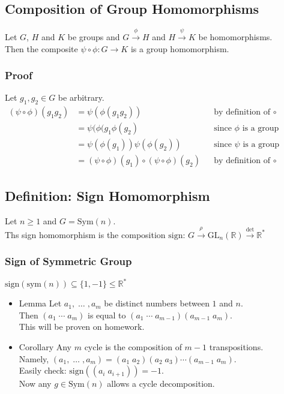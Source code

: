 \documentclass[11pt]{article}
\newcommand{\0}{\emptyset}
\newcommand{\R}{\mathbb{R}}
\begin{document}
\subsection*{Composition of Group Homomorphisms}
\label{sec:org04c6ffb}
Let \(G\), \(H\) and \(K\) be groups and \(G\overset{\phi}{\to}H\) and \(H\overset{\psi}{\to}K\) be homomorphisms.\\[0pt]
Then the composite \(\psi\circ\phi:G\to K\) is a group homomorphism.\\[0pt]
\subsubsection*{Proof}
\label{sec:orgb0ebbba}
Let \(g_{1},g_{2}\in G\) be arbitrary.\\[0pt]
\begin{align*}
  (\psi\circ\phi)(g_{1}g_{2})
  &=\psi(\phi(g_{1}g_{2})) && \text{by definition of }\circ
  \\&=\psi(\phi(g_{1}\phi(g_{2}) && \text{since $\phi$ is a group homomorphism}
  \\&=\psi(\phi(g_{1}))\psi(\phi(g_{2})) && \text{since $\psi$ is a group homomorphism}
  \\&=(\psi\circ\phi)(g_{1})\circ(\psi\circ\phi)(g_{2}) && \text{by definition of }\circ
\end{align*}
\subsection*{Definition: Sign Homomorphism}
\label{sec:org51f7452}
Let \(n\geq1\) and \(G=\text{Sym}(n)\).\\[0pt]
Ths sign homomorphism is the composition \(\text{sign: }G\overset{\rho}{\to}\text{GL}_{n}(\R)\overset{\det}{\to}\R^{*}\)\\[0pt]
\subsubsection*{Sign of Symmetric Group}
\label{sec:orgf0219d3}
\(\text{sign}(\text{sym}(n))\subseteq\{1,-1\}\leq\R^{*}\)\\[0pt]
\begin{itemize}
\item Lemma
\label{sec:orgf5e1730}
Let \(a_{1},\;\ldots\;,a_{m}\) be distinct numbers between \(1\) and \(n\).\\[0pt]
Then \((a_{1}\;\cdots\;a_{m})\) is equal to \((a_{1}\;\cdots\;a_{m-1})(a_{m-1}\;a_{m})\).\\[0pt]
This will be proven on homework.\\[0pt]
\item Corollary
\label{sec:org27880f8}
Any \(m\) cycle is the composition of \(m-1\) transpositions.\\[0pt]
Namely, \((a_{1},\;\ldots\;,a_{m})=(a_{1}\;a_{2})(a_{2}\;a_{3})\cdots(a_{m-1}\;a_{m})\).\\[0pt]
Easily check: \(\text{sign}((a_{i}\;a_{i+1}))=-1\).\\[0pt]
Now any \(g\in\text{Sym}(n)\) allows a cycle decomposition.\\[0pt]
\end{itemize}
\end{document}
